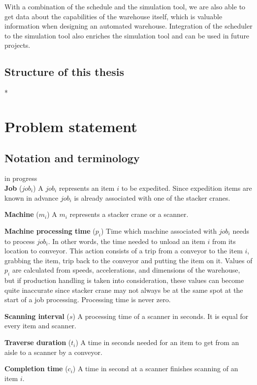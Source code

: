 \documentclass{ctuthesis}
\begin{document}
With a combination of the schedule and the simulation tool, we are also able to get data about the capabilities of the warehouse itself, which is valuable information when designing an automated warehouse. Integration of the scheduler to the simulation tool also enriches the simulation tool and can be used in future projects.

\section{Structure of this thesis}
*


\chapter{Problem statement}

\section{Notation and terminology}
in progress\\
\noindent \textbf{Job} ($job_i$) A $job_i$ represents an item $i$ to be expedited. Since expedition items are known in advance $job_i$ is already associated with one of the stacker cranes. 

\noindent \textbf{Machine} ($m_i$) A $m_i$ represents a stacker crane or a scanner. 

\noindent \textbf{Machine processing time} ($p_i$) Time which machine associated with $job_i$ needs to process $job_i$. In other words, the time needed to unload an item $i$ from its location to conveyor. This action consists of a trip from a conveyor to the item $i$, grabbing the item, trip back to the conveyor and putting the item on it. Values of $p_i$ are calculated from speeds, accelerations, and dimensions of the warehouse, but if production handling is taken into consideration, these values can become quite inaccurate since stacker crane may not always be at the same spot at the start of a job processing. Processing time is never zero.


\noindent \textbf{Scanning interval} ($s$) A processing time of a scanner in seconds. It is equal for every item and scanner.

\noindent \textbf{Traverse duration} ($t_i$) A time in seconds needed for an item to get from an aisle to a scanner by a conveyor.

\noindent \textbf{Completion time} ($c_i$) A time in second at a scanner finishes scanning of an item $i$.
\end{document}
